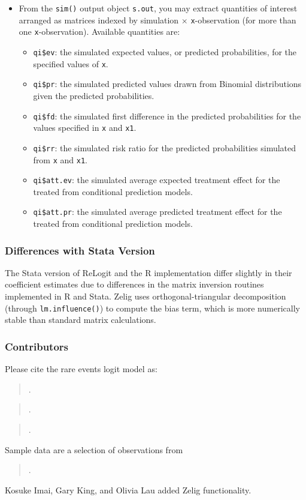 \begin{itemize}
\item From the {\tt sim()} output object {\tt s.out}, you may extract
  quantities of interest arranged as matrices indexed by simulation
  $\times$ {\tt x}-observation (for more than one {\tt x}-observation).
  Available quantities are:

   \begin{itemize}
   \item {\tt qi\$ev}: the simulated expected values, or predicted
     probabilities, for the specified values of {\tt x}.
   \item {\tt qi\$pr}: the simulated predicted values drawn from Binomial
     distributions given the predicted probabilities.  
   \item {\tt qi\$fd}: the simulated first difference in the predicted
     probabilities for the values specified in {\tt x} and {\tt x1}.
   \item {\tt qi\$rr}: the simulated risk ratio for the predicted
     probabilities simulated from {\tt x} and {\tt x1}.
   \item {\tt qi\$att.ev}: the simulated average expected treatment
     effect for the treated from conditional prediction models.  
   \item {\tt qi\$att.pr}: the simulated average predicted treatment
     effect for the treated from conditional prediction models.  
   \end{itemize}
\end{itemize}

\subsubsection{Differences with Stata Version}
The Stata version of ReLogit and the R implementation differ slightly
in their coefficient estimates due to differences in the matrix
inversion routines implemented in R and Stata.  Zelig uses
orthogonal-triangular decomposition (through {\tt lm.influence()}) to
compute the bias term, which is more numerically stable than
standard matrix calculations.

\subsubsection{Contributors}

Please cite the rare events logit model as:
\begin{verse}
.
\end{verse}
\begin{verse}
.
\end{verse} 
\begin{verse}
.
\end{verse}

Sample data are a selection of observations from 
\begin{verse}
.  
\end{verse}

Kosuke Imai, Gary King, and Olivia Lau added Zelig functionality.  


